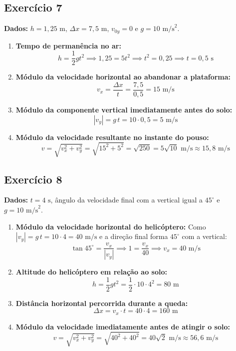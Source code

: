 \documentclass[11pt, a4paper]{article}
\begin{document}
\subsection*{Exercício 7}
\textbf{Dados:} $h = 1{,}25\text{ m}$, $\Delta x = 7{,}5\text{ m}$, $v_{0y} = 0$ e $g = 10\text{ m/s}^2$.

\begin{enumerate}[label=\textbf{(\alph*)}]
    \item \textbf{Tempo de permanência no ar:}
    \[
        h = \frac{1}{2} g t^2 \implies 1{,}25 = 5t^2 \implies t^2 = 0{,}25 \implies t = 0{,}5\text{ s}
    \]

    \item \textbf{Módulo da velocidade horizontal ao abandonar a plataforma:}
    \[
        v_x = \frac{\Delta x}{t} = \frac{7{,}5}{0{,}5} = 15\text{ m/s}
    \]

    \item \textbf{Módulo da componente vertical imediatamente antes do solo:}
    \[
        |v_y| = g\,t = 10 \cdot 0{,}5 = 5\text{ m/s}
    \]

    \item \textbf{Módulo da velocidade resultante no instante do pouso:}
    \[
        v = \sqrt{v_x^2 + v_y^2} = \sqrt{15^2 + 5^2} = \sqrt{250} = 5\sqrt{10}\text{ m/s} \approx 15{,}8\text{ m/s}
    \]
\end{enumerate}

\subsection*{Exercício 8}
\textbf{Dados:} $t = 4\text{ s}$, ângulo da velocidade final com a vertical igual a $45^\circ$ e $g = 10\text{ m/s}^2$.

\begin{enumerate}[label=\textbf{(\alph*)}]
    \item \textbf{Módulo da velocidade horizontal do helicóptero:}
    Como $|v_y| = g\,t = 10 \cdot 4 = 40\text{ m/s}$ e a direção final forma $45^\circ$ com a vertical:
    \[
        \tan 45^\circ = \frac{v_x}{|v_y|} \implies 1 = \frac{v_x}{40} \implies v_x = 40\text{ m/s}
    \]

    \item \textbf{Altitude do helicóptero em relação ao solo:}
    \[
        h = \frac{1}{2} g t^2 = \frac{1}{2} \cdot 10 \cdot 4^2 = 80\text{ m}
    \]

    \item \textbf{Distância horizontal percorrida durante a queda:}
    \[
        \Delta x = v_x \cdot t = 40 \cdot 4 = 160\text{ m}
    \]

    \item \textbf{Módulo da velocidade imediatamente antes de atingir o solo:}
    \[
        v = \sqrt{v_x^2 + v_y^2} = \sqrt{40^2 + 40^2} = 40\sqrt{2}\text{ m/s} \approx 56{,}6\text{ m/s}
    \]
\end{enumerate}
\end{document}
